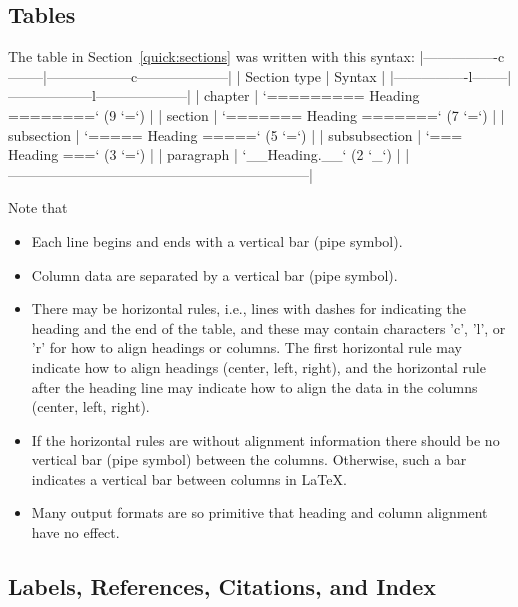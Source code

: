 \documentclass{book}
\begin{document}
{\subsection{Tables}

The table in Section~\ref{quick:sections} was written with this
syntax:
\bccq
|----------------c--------|------------------c--------------------|
|      Section type       |        Syntax                         |
|----------------l--------|------------------l--------------------|
| chapter                 | `========= Heading ========` (9 `=`)  |
| section                 | `======= Heading =======`    (7 `=`)  |
| subsection              | `===== Heading =====`        (5 `=`)  |
| subsubsection           | `=== Heading ===`            (3 `=`)  |
| paragraph               | `__Heading.__`               (2 `_`)  |
|-----------------------------------------------------------------|
\eccq

Note that

\begin{itemize}
 \item Each line begins and ends with a vertical bar (pipe symbol).

 \item Column data are separated by a vertical bar (pipe symbol).

 \item There may be horizontal rules, i.e., lines with dashes for
   indicating the heading and the end of the table, and these may
   contain characters 'c', 'l', or 'r' for how to align headings or
   columns. The first horizontal rule may indicate how to align
   headings (center, left, right), and the horizontal rule after the
   heading line may indicate how to align the data in the columns
   (center, left, right).

 \item If the horizontal rules are without alignment information there should
   be no vertical bar (pipe symbol) between the columns. Otherwise, such
   a bar indicates a vertical bar between columns in {\LaTeX}.

 \item Many output formats are so primitive that heading and column alignment
   have no effect.
\end{itemize}

\noindent

\subsection{Labels, References, Citations, and Index}

}
\end{document}
